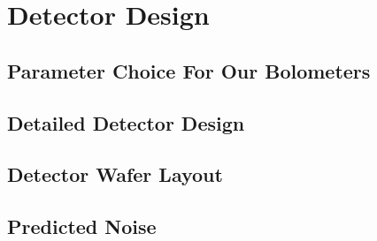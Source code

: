\chapter{Detector Design}\label{c:det-design}

\section{Parameter Choice For Our Bolometers} \label{sec:det-parm-choice}

\section{Detailed Detector Design} \label{sec:ch5-det-design}

\section{Detector Wafer Layout} \label{sec:ch5-layout}

\section{Predicted Noise} \label{sec:ch5-predicted-noise}


